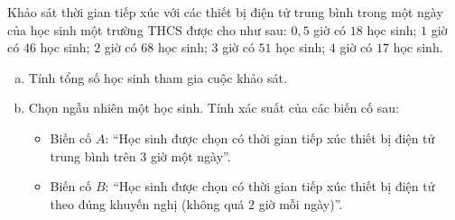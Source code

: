 \begin{bt}%
Khảo sát thời gian tiếp xúc với các thiết bị điện tử trung bình trong một ngày của học sinh một trường THCS được cho như sau: $0{,}5$ giờ có $18$ học sinh; $1$ giờ có $46$ học sinh; $2$ giờ có $68$ học sinh; $3$ giờ có $51$ học sinh; $4$ giờ có $17$ học sinh.
	\begin{enumerate}[a)]
		\item Tính tổng số học sinh tham gia cuộc khảo sát.
		\item Chọn ngẫu nhiên một học sinh. Tính xác suất của các biến cố sau:
		\begin{itemize}
			\item Biến cố $A$: ``Học sinh được chọn có thời gian tiếp xúc thiết bị điện tử trung bình trên $3$ giờ một ngày''.
			\item Biến cố $B$: ``Học sinh được chọn có thời gian tiếp xúc thiết bị điện tử theo đúng khuyến nghị (không quá $2$ giờ mỗi ngày)''.
		\end{itemize}
	\end{enumerate}
\end{bt}


